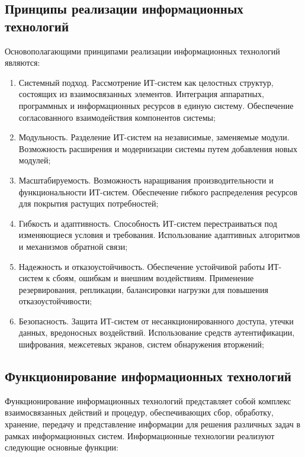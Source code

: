 \documentclass{ou}
\begin{document}
\subsection{Принципы реализации информационных технологий}
Основополагающими принципами реализации информационных технологий являются:
\begin{enumerate}[itemindent=4em, nosep, label=\arabic*)]
    \item Системный подход. Рассмотрение ИТ-систем как целостных структур, состоящих из взаимосвязанных элементов. Интеграция аппаратных, программных и информационных ресурсов в единую систему. Обеспечение согласованного взаимодействия компонентов системы;
    \item Модульность. Разделение ИТ-систем на независимые, заменяемые модули. Возможность расширения и модернизации системы путем добавления новых модулей;
    \item Масштабируемость. Возможность наращивания производительности и функциональности ИТ-систем. Обеспечение гибкого распределения ресурсов для покрытия растущих потребностей;
    \item Гибкость и адаптивность. Способность ИТ-систем перестраиваться под изменяющиеся условия и требования. Использование адаптивных алгоритмов и механизмов обратной связи;
    \item Надежность и отказоустойчивость. Обеспечение устойчивой работы ИТ-систем к сбоям, ошибкам и внешним воздействиям. Применение резервирования, репликации, балансировки нагрузки для повышения отказоустойчивости;
    \item Безопасность. Защита ИТ-систем от несанкционированного доступа, утечки данных, вредоносных воздействий. Использование средств аутентификации, шифрования, межсетевых экранов, систем обнаружения вторжений;
\end{enumerate}

\subsection{Функционирование информационных технологий}
Функционирование информационных технологий представляет собой комплекс взаимосвязанных действий и процедур, обеспечивающих сбор, обработку, хранение, передачу и представление информации для решения различных задач в рамках информационных систем. Информационные технологии реализуют следующие основные функции:
\end{document}
